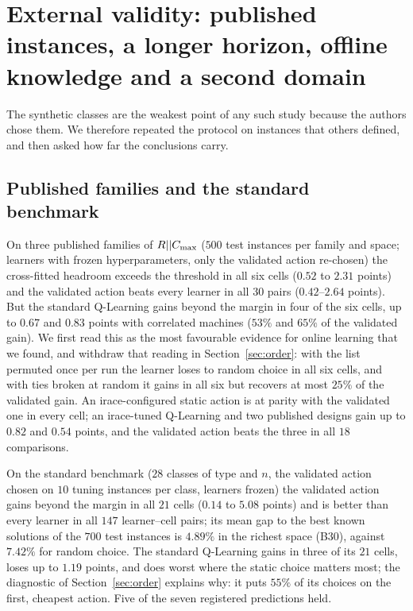 \section{External validity: published instances, a longer horizon, offline knowledge and a second domain}
\label{sec:external}
The synthetic classes are the weakest point of any such study because the authors chose them. We therefore repeated the protocol on instances that others defined, and then asked how far the conclusions carry.

\subsection{Published families and the standard benchmark}
\label{sec:families}\label{sec:fanjul}
On three published families of $R||C_{\max}$ ($500$ test instances per family and space; learners with frozen hyperparameters, only the validated action re-chosen) the cross-fitted headroom exceeds the threshold in all six cells ($0.52$ to $2.31$ points) and the validated action beats every learner in all $30$ pairs ($0.42$--$2.64$ points). But the standard Q-Learning gains beyond the margin in four of the six cells, up to $0.67$ and $0.83$ points with correlated machines ($53\%$ and $65\%$ of the validated gain). We first read this as the most favourable evidence for online learning that we found, and withdraw that reading in Section~\ref{sec:order}: with the list permuted once per run the learner loses to random choice in all six cells, and with ties broken at random it gains in all six but recovers at most $25\%$ of the validated gain. An irace-configured static action is at parity with the validated one in every cell; an irace-tuned Q-Learning and two published designs gain up to $0.82$ and $0.54$ points, and the validated action beats the three in all $18$ comparisons.

On the standard benchmark ($28$ classes of type and $n$, the validated action chosen on $10$ tuning instances per class, learners frozen) the validated action gains beyond the margin in all $21$ cells ($0.14$ to $5.08$ points) and is better than every learner in all $147$ learner--cell pairs; its mean gap to the best known solutions of the $700$ test instances is $4.89\%$ in the richest space (B30), against $7.42\%$ for random choice. The standard Q-Learning gains in three of its $21$ cells, loses up to $1.19$ points, and does worst where the static choice matters most; the diagnostic of Section~\ref{sec:order} explains why: it puts $55\%$ of its choices on the first, cheapest action. Five of the seven registered predictions held.

